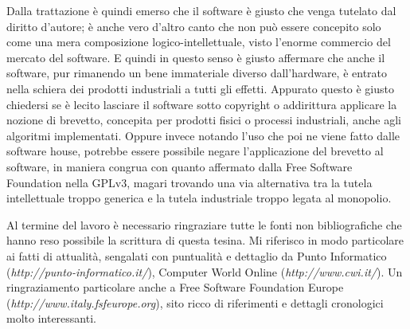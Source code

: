 Dalla trattazione è quindi emerso che il software è giusto che venga tutelato dal diritto d'autore; è anche vero d'altro canto che non può essere concepito solo come una mera composizione logico-intellettuale, visto l'enorme commercio del mercato del software. E quindi in questo senso è giusto affermare che anche il software, pur rimanendo un bene immateriale diverso dall'hardware, è entrato nella schiera dei prodotti industriali a tutti gli effetti. Appurato questo è giusto chiedersi se è lecito lasciare il software sotto copyright o addirittura applicare la nozione di brevetto, concepita per prodotti fisici o processi industriali, anche agli algoritmi implementati. Oppure invece notando l'uso che poi ne viene fatto dalle software house, potrebbe essere possibile negare l'applicazione del brevetto al software, in maniera congrua con quanto affermato dalla Free Software Foundation nella GPLv3, magari trovando una via alternativa tra la tutela intellettuale troppo generica e la tutela industriale troppo legata al monopolio.

Al termine del lavoro è necessario ringraziare tutte le fonti non bibliografiche che hanno reso possibile la scrittura di questa tesina. Mi riferisco in modo particolare ai fatti di attualità, sengalati con puntualità e dettaglio da Punto Informatico (\textit{http://punto-informatico.it/}), Computer World Online (\textit{http://www.cwi.it/}). Un ringraziamento particolare anche a Free Software Foundation Europe 
\\(\textit{http://www.italy.fsfeurope.org}), sito ricco di riferimenti e dettagli cronologici molto interessanti.